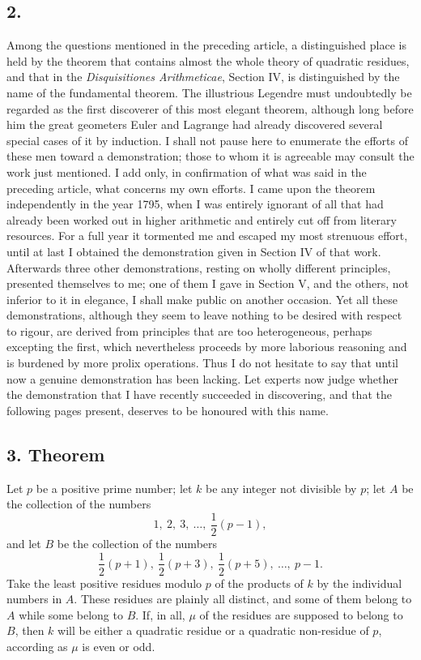 \documentclass[12pt]{article}
\begin{document}
\subsection*{2.}

Among the questions mentioned in the preceding article, a distinguished place is held by the theorem that contains almost the whole theory of quadratic residues, and that in the \emph{Disquisitiones Arithmeticae}, Section IV, is distinguished by the name of the fundamental theorem. The illustrious Legendre must undoubtedly be regarded as the first discoverer of this most elegant theorem, although long before him the great geometers Euler and Lagrange had already discovered several special cases of it by induction. I shall not pause here to enumerate the efforts of these men toward a demonstration; those to whom it is agreeable may consult the work just mentioned. I add only, in confirmation of what was said in the preceding article, what concerns my own efforts. I came upon the theorem independently in the year 1795, when I was entirely ignorant of all that had already been worked out in higher arithmetic and entirely cut off from literary resources. For a full year it tormented me and escaped my most strenuous effort, until at last I obtained the demonstration given in Section IV of that work. Afterwards three other demonstrations, resting on wholly different principles, presented themselves to me; one of them I gave in Section V, and the others, not inferior to it in elegance, I shall make public on another occasion. Yet all these demonstrations, although they seem to leave nothing to be desired with respect to rigour, are derived from principles that are too heterogeneous, perhaps excepting the first, which nevertheless proceeds by more laborious reasoning and is burdened by more prolix operations. Thus I do not hesitate to say that until now a genuine demonstration has been lacking. Let experts now judge whether the demonstration that I have recently succeeded in discovering, and that the following pages present, deserves to be honoured with this name.

\subsection*{3. Theorem}

Let $p$ be a positive prime number; let $k$ be any integer not divisible by $p$; let $A$ be the collection of the numbers
\[
1,\ 2,\ 3,\ \ldots,\ \frac12(p-1),
\]
and let $B$ be the collection of the numbers
\[
\frac12(p+1),\ \frac12(p+3),\ \frac12(p+5),\ \ldots,\ p-1.
\]
Take the least positive residues modulo $p$ of the products of $k$ by the individual numbers in $A$. These residues are plainly all distinct, and some of them belong to $A$ while some belong to $B$. If, in all, $\mu$ of the residues are supposed to belong to $B$, then $k$ will be either a quadratic residue or a quadratic non-residue of $p$, according as $\mu$ is even or odd.
\end{document}
